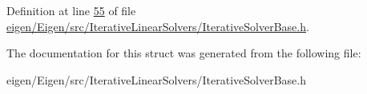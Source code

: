 Definition at line \hyperlink{eigen_2_eigen_2src_2_iterative_linear_solvers_2_iterative_solver_base_8h_source_l00055}{55} of file \hyperlink{eigen_2_eigen_2src_2_iterative_linear_solvers_2_iterative_solver_base_8h_source}{eigen/\+Eigen/src/\+Iterative\+Linear\+Solvers/\+Iterative\+Solver\+Base.\+h}.



The documentation for this struct was generated from the following file\+:\begin{DoxyCompactItemize}
\item 
eigen/\+Eigen/src/\+Iterative\+Linear\+Solvers/\+Iterative\+Solver\+Base.\+h\end{DoxyCompactItemize}
